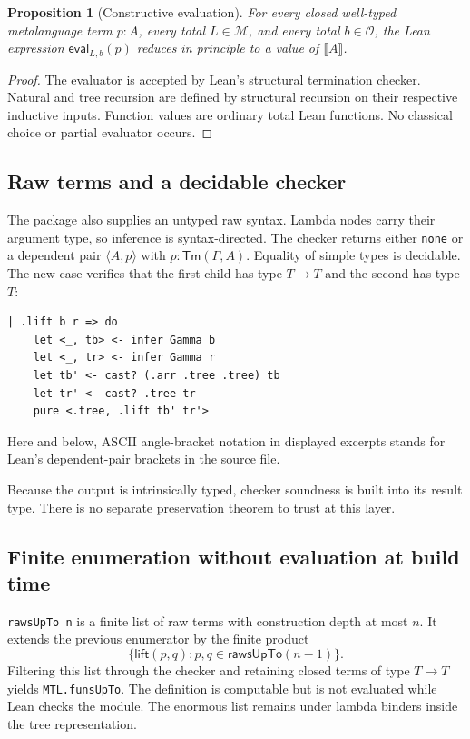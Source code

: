 \documentclass[11pt]{article}
\newtheorem{proposition}[theorem]{Proposition}
\theoremstyle{definition}
\newcommand{\Op}{\mathcal{O}}
\newcommand{\MOp}{\mathcal{M}}
\newcommand{\code}[1]{\texttt{#1}}
\begin{document}
\begin{proposition}[Constructive evaluation]
For every closed well-typed metalanguage term \(p:A\), every total
\(L\in\MOp\), and every total \(b\in\Op\), the Lean expression
\(\mathsf{eval}_{L,b}(p)\) reduces in principle to a value of
\(\llbracket A\rrbracket\).
\end{proposition}

\begin{proof}
The evaluator is accepted by Lean's structural termination checker.  Natural
and tree recursion are defined by structural recursion on their respective
inductive inputs.  Function values are ordinary total Lean functions.  No
classical choice or partial evaluator occurs.
\end{proof}

\subsection{Raw terms and a decidable checker}

The package also supplies an untyped raw syntax.  Lambda nodes carry their
argument type, so inference is syntax-directed.  The checker returns either
\code{none} or a dependent pair \(\langle A,p\rangle\) with
\(p:\mathsf{Tm}(\Gamma,A)\).  Equality of simple types is decidable.  The new
case verifies that the first child has type \(T\to T\) and the second has type
\(T\):
\begin{lstlisting}
| .lift b r => do
    let <_, tb> <- infer Gamma b
    let <_, tr> <- infer Gamma r
    let tb' <- cast? (.arr .tree .tree) tb
    let tr' <- cast? .tree tr
    pure <.tree, .lift tb' tr'>
\end{lstlisting}
Here and below, ASCII angle-bracket notation in displayed excerpts stands for
Lean's dependent-pair brackets in the source file.

Because the output is intrinsically typed, checker soundness is built into its
result type.  There is no separate preservation theorem to trust at this
layer.

\subsection{Finite enumeration without evaluation at build time}

\code{rawsUpTo n} is a finite list of raw terms with construction depth at
most \(n\).  It extends the previous enumerator by the finite product
\[
  \{\mathsf{lift}(p,q): p,q\in\mathsf{rawsUpTo}(n-1)\}.
\]
Filtering this list through the checker and retaining closed terms of type
\(T\to T\) yields \code{MTL.funsUpTo}.  The definition is computable but is
not evaluated while Lean checks the module.  The enormous list remains under
lambda binders inside the tree representation.
\end{document}
